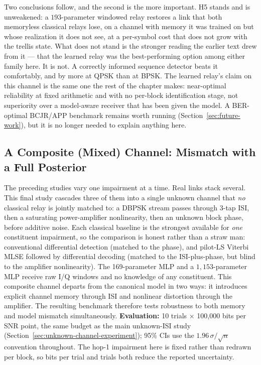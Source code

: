 Two conclusions follow, and the second is the more important. H5 stands and is unweakened: a $193$-parameter windowed relay restores a link that both memoryless classical relays lose, on a channel with memory it was trained on but whose realization it does not see, at a per-symbol cost that does not grow with the trellis state. What does not stand is the stronger reading the earlier text drew from it --- that the learned relay was the best-performing option among either family here. It is not. A correctly informed sequence detector beats it comfortably, and by more at QPSK than at BPSK. The learned relay's claim on this channel is the same one the rest of the chapter makes: near-optimal reliability at fixed arithmetic and with no per-block identification stage, not superiority over a model-aware receiver that has been given the model. A BER-optimal BCJR/APP benchmark remains worth running (Section~\ref{sec:future-work}), but it is no longer needed to explain anything here.

\subsection{A Composite (Mixed) Channel: Mismatch with a Full Posterior}\label{sec:composite-channel}

The preceding studies vary one impairment at a time. Real links stack several. This final study cascades three of them into a single unknown channel that \emph{no} classical relay is jointly matched to: a DBPSK stream passes through 3-tap ISI, then a saturating power-amplifier nonlinearity, then an unknown block phase, before additive noise. Each classical baseline is the strongest available for \emph{one} constituent impairment, so the comparison is honest rather than a straw man: conventional differential detection (matched to the phase), and pilot-LS Viterbi MLSE followed by differential decoding (matched to the ISI-plus-phase, but blind to the amplifier nonlinearity). The 169-parameter MLP and a $1{,}153$-parameter MLP receive raw I/Q windows and no knowledge of any constituent. This composite channel departs from the canonical model in two ways: it introduces explicit channel memory through ISI and nonlinear distortion through the amplifier. The resulting benchmark therefore tests robustness to both memory and model mismatch simultaneously. \textbf{Evaluation:} 10 trials $\times$ 100{,}000 bits per SNR point, the same budget as the main unknown-ISI study (Section~\ref{sec:unknown-channel-experiment}); 95\% CIs use the $1.96\,\sigma/\sqrt{n}$ convention throughout. The hop-1 impairment here is fixed rather than redrawn per block, so bits per trial and trials both reduce the reported uncertainty.

